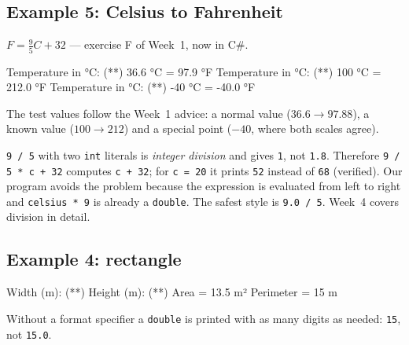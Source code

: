 \subsection{Example 5: Celsius to Fahrenheit}
$F = \frac{9}{5}C + 32$ --- exercise F of Week~1, now in C\#.

\begin{consolebox}
\begin{run}
Temperature in °C: (**)
36.6 °C = 97.9 °F
Temperature in °C: (**)
100 °C = 212.0 °F
Temperature in °C: (**)
-40 °C = -40.0 °F
\end{run}
\end{consolebox}
The test values follow the Week~1 advice: a normal value ($36.6 \to 97.88$), a known value ($100 \to 212$) and a special point ($-40$, where both scales agree).
\begin{warnbox}
\texttt{9 / 5} with two \texttt{int} literals is \emph{integer division} and gives \texttt{1}, not \texttt{1.8}. Therefore \texttt{9 / 5 * c + 32} computes \texttt{c + 32}; for \texttt{c = 20} it prints \texttt{52} instead of \texttt{68} (verified). Our program avoids the problem because the expression is evaluated from left to right and \texttt{celsius * 9} is already a \texttt{double}. The safest style is \texttt{9.0 / 5}. Week~4 covers division in detail.
\end{warnbox}

\subsection{Example 4: rectangle}

\begin{consolebox}
\begin{run}
Width  (m): (**)
Height (m): (**)
Area      = 13.5 m²
Perimeter = 15 m
\end{run}
\end{consolebox}
Without a format specifier a \texttt{double} is printed with as many digits as needed: \texttt{15}, not \texttt{15.0}.

